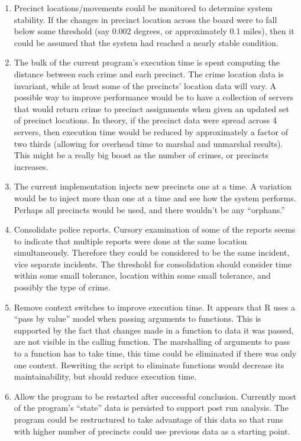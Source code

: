 \begin{enumerate}
\item Precinct locations/movements could be monitored to determine system stability.  If the changes in precinct location across the board were to fall below some threshold (say 0.002 degrees, or approximately 0.1 miles), then it could be assumed that the system had reached a nearly stable condition.
\item The bulk of the current program's execution time is spent computing the distance between each crime and each precinct.  The crime location data is invariant, while at least some of the precincts' location data will vary.  A possible way to improve performance would be to have a collection of servers that would return crime to precinct assignments when given an updated set of precinct locations.  In theory, if the precinct data were spread across 4 servers, then execution time would be reduced by approximately a factor of two thirds (allowing for overhead time to marshal and unmarshal results).  This might be a really big boost as the number of crimes, or precincts increases.
\item The current implementation injects new precincts one at a time.  A variation would be to inject more than one at a time and see how the system performs.  Perhaps all precincts would be used, and there wouldn't be any ``orphans.''
\item Consolidate police reports.  Cursory examination of some of the reports seems to indicate that multiple reports were done at the same location simultaneously.  Therefore they could be considered to be the same incident, vice separate incidents.  The threshold for consolidation should consider time within some small tolerance, location within some small tolerance, and possibly the type of crime.
\item Remove context switches to improve execution time.  It appears that R uses a ``pass by value'' model when passing arguments to functions.  This is supported by the fact that changes made in a function to data it was passed, are not visible in the calling function.  The marshalling of arguments to pass to a function has to take time, this time could be eliminated if there was only one context.  Rewriting the script to eliminate functions would decrease its maintainability, but should reduce execution time.
  \item Allow the program to be restarted after successful conclusion.  Currently most of the program's ``state'' data is persisted to support post run analysis.  The program could be restructured to take advantage of this data so that runs with higher number of precincts could use previous data as a starting point.
\end{enumerate}
